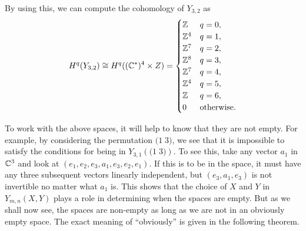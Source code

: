 \begin{example}
  By using this, we can compute the cohomology of $Y_{3,2}$ as
  \[ H^q(Y_{3,2}) \cong H^q((\mathbb{C}^*)^4\times Z) = 
  \begin{cases}
    \mathbb{Z} & q = 0, \\
    \mathbb{Z}^4 & q = 1, \\
    \mathbb{Z}^7 & q = 2, \\
    \mathbb{Z}^8 & q = 3, \\
    \mathbb{Z}^7 & q = 4, \\
    \mathbb{Z}^4 & q = 5, \\
    \mathbb{Z} & q = 6, \\
    0 & \text{otherwise}.
  \end{cases} \]
\end{example}



To work with the above spaces, it will help to know that they are not
empty. For example, by considering the permutation $\big(1\; 3\big)$,
we see that it is impossible to satisfy the 
conditions for being in $Y_{3,1}\left(\big(1\; 3\big)\right)$. To see
this, take any vector $a_1$ in $\mathbb{C}^3$ and look at
$(e_1,e_2,e_3,a_1,e_3,e_2,e_1)$. If this is to be in the space, it
must have any three subsequent vectors linearly independent, but
$(e_3,a_1,e_3)$ is not invertible no matter what $a_1$ is. This shows
that the choice of $X$ and $Y$ in $Y_{m,n}(X,Y)$ plays a role in
determining when the spaces are empty. But as we shall now see, the
spaces are non-empty as long as we are not in an obviously empty
space. The exact meaning of ``obviously'' is given in the following
theorem.


